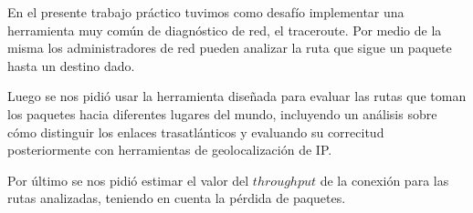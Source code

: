 En el presente trabajo práctico tuvimos como desafío implementar una herramienta muy común de diagnóstico de red, el traceroute.
Por medio de la misma los administradores de red pueden analizar la ruta que sigue un paquete hasta un destino dado.

Luego se nos pidió usar la herramienta diseñada para evaluar las rutas que toman los paquetes hacia diferentes lugares del mundo, incluyendo un análisis sobre cómo distinguir los enlaces trasatlánticos y evaluando su correcitud posteriormente con herramientas de geolocalización de IP.

Por último se nos pidió estimar el valor del $throughput$ de la conexión para las rutas analizadas, teniendo en cuenta la pérdida de paquetes.

